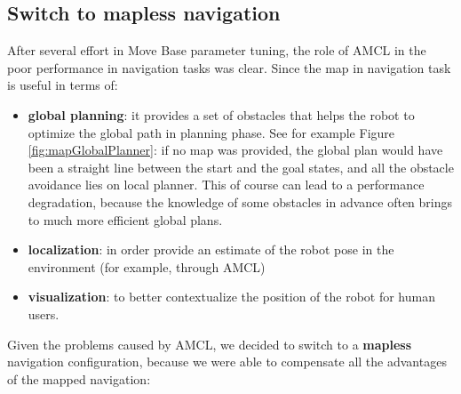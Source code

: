 \subsection{Switch to mapless navigation}
After several effort in Move Base parameter tuning, the role of  \ac{AMCL} in the poor performance in navigation tasks was clear. Since the map in navigation task is useful in terms of:
\begin{itemize}
	\item \textbf{global planning}: it provides a set of obstacles that helps the robot to optimize the global path in planning phase. See for example Figure \ref{fig:mapGlobalPlanner}: if no map was provided, the global plan would have been a straight line between the start and the goal states, and all the obstacle avoidance lies on local planner. This of course can lead to a performance degradation, because the knowledge of some obstacles in advance often brings to much more efficient global plans.
	\item \textbf{localization}: in order provide an estimate of the robot pose in the environment (for example, through \ac{AMCL})
	\item \textbf{visualization}: to better contextualize the position of the robot for human users. 
\end{itemize}

Given the problems caused by \ac{AMCL}, we decided to switch to a \textbf{mapless} navigation configuration, because we were able to compensate all the advantages of the mapped navigation:

